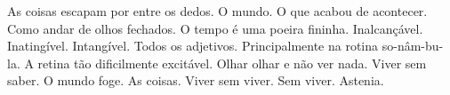 \noindent As coisas escapam por entre os dedos. O mundo. O que acabou de
acontecer. Como andar de olhos fechados. O tempo é uma poeira
fininha. Inalcançável. Inatingível. Intangível. Todos os adjetivos.
Principalmente na rotina so-nâm-bu-la. A retina tão dificilmente
excitável. Olhar olhar e não ver nada. Viver sem saber. O mundo
foge. As coisas. Viver sem viver. Sem viver. Astenia.
